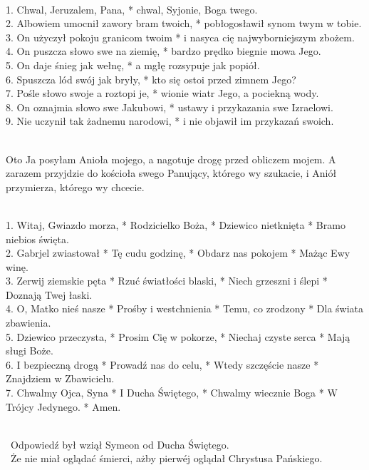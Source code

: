 \\
1. Chwal, Jeruzalem, Pana, * chwal, Syjonie, Boga twego.\\
2. Albowiem umocnił zawory bram twoich, * pobłogosławił synom twym w tobie.\\
3. On użyczył pokoju granicom twoim * i nasyca cię najwyborniejszym zbożem.\\
4. On puszcza słowo swe na ziemię, * bardzo prędko biegnie mowa Jego.\\
5. On daje śnieg jak wełnę, * a mgłę rozsypuje jak popiół.\\
6. Spuszcza lód swój jak bryły, * kto się ostoi przed zimnem Jego?\\
7. Pośle słowo swoje a roztopi je, * wionie wiatr Jego, a pociekną wody.\\
8. On oznajmia słowo swe Jakubowi, * ustawy i przykazania swe Izraelowi.\\
9. Nie uczynił tak żadnemu narodowi, * i nie objawił im przykazań swoich.

\\
Oto Ja posyłam Anioła mojego, a nagotuje drogę przed obliczem mojem. A zarazem przyjdzie do kościoła swego Panujący, którego wy szukacie, i Aniół przymierza, którego wy chcecie.

\\
1. Witaj, Gwiazdo morza, * Rodzicielko Boża, * Dziewico nietknięta * Bramo niebios święta.\\
2. Gabrjel zwiastował * Tę cudu godzinę, * Obdarz nas pokojem * Mażąc Ewy winę.\\
3. Zerwij ziemskie pęta * Rzuć światłości blaski, * Niech grzeszni i ślepi * Doznają Twej łaski.\\
4. O, Matko nieś nasze * Prośby i westchnienia * Temu, co zrodzony * Dla świata zbawienia.\\
5. Dziewico przeczysta, * Prosim Cię w pokorze, * Niechaj czyste serca * Mają sługi Boże.\\
6. I bezpieczną drogą * Prowadź nas do celu, * Wtedy szczęście nasze * Znajdziem w Zbawicielu.\\
7. Chwalmy Ojca, Syna * I Ducha Świętego, * Chwalmy wiecznie Boga * W Trójcy Jedynego. * Amen.

\\
~Odpowiedź był wziął Symeon od Ducha Świętego.\\
~Że nie miał oglądać śmierci, ażby pierwéj oglądał Chrystusa Pańskiego.

